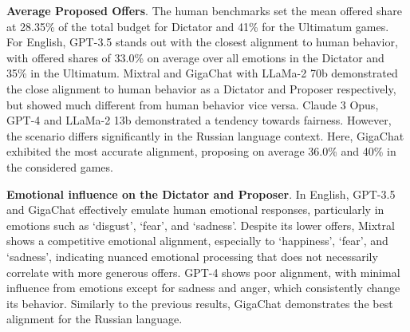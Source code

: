 \documentclass{article}
\begin{document}


\textbf{Average Proposed Offers}. The human benchmarks set the mean offered share at 28.35\% of the total budget for Dictator and 41\% for the Ultimatum games. For English, GPT-3.5 stands out with the closest alignment to human behavior, with offered shares of 33.0\% on average over all emotions in the Dictator and 35\% in the Ultimatum. Mixtral and GigaChat with LLaMa-2 70b demonstrated the close alignment to human behavior as a Dictator and Proposer respectively, but showed much different from human behavior vice versa. Claude 3 Opus, GPT-4 and LLaMa-2 13b demonstrated a tendency towards fairness. 
However, the scenario differs significantly in the Russian language context. Here, GigaChat exhibited the most accurate alignment, proposing on average 36.0\% and 40\% in the considered games.





\textbf{Emotional influence on the Dictator and Proposer}. In English, GPT-3.5 and GigaChat effectively emulate human emotional responses, particularly in emotions such as `disgust', `fear', and `sadness'. Despite its lower offers, Mixtral shows a competitive emotional alignment, especially to `happiness', `fear', and `sadness', indicating nuanced emotional processing that does not necessarily correlate with more generous offers. GPT-4 shows poor alignment, with minimal influence from emotions except for sadness and anger, which consistently change its behavior. Similarly to the previous results, GigaChat demonstrates the best alignment for the Russian language.
\end{document}
